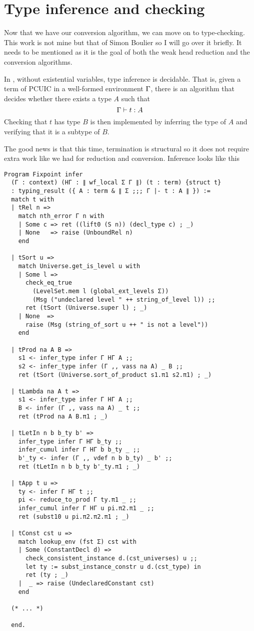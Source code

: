 \chapter{Type inference and checking}

Now that we have our conversion algorithm, we can move on to type-checking.
This work is not mine but that of Simon Boulier so I will go over it briefly.
It needs to be mentioned as it is the goal of both the weak head reduction
and the conversion algorithms.

In \Coq, without existential variables, type inference is decidable. That is,
given a term of \acrshort{PCUIC} in a well-formed environment \(\Gamma\), there is
an algorithm that decides whether there exists a type \(A\) such that
\[
  \Gamma \vdash t : A
\]
%
Checking that \(t\) has type \(B\) is then implemented by inferring the type of
\(A\) and verifying that it is a subtype of \(B\).

The good news is that this time, termination is structural so it does not require
extra work like we had for reduction and conversion.
Inference looks like this
\begin{verbatim}
Program Fixpoint infer
  (Γ : context) (HΓ : ∥ wf_local Σ Γ ∥) (t : term) {struct t}
  : typing_result ({ A : term & ∥ Σ ;;; Γ |- t : A ∥ }) :=
  match t with
  | tRel n =>
    match nth_error Γ n with
    | Some c => ret ((lift0 (S n)) (decl_type c) ; _)
    | None   => raise (UnboundRel n)
    end

  | tSort u =>
    match Universe.get_is_level u with
    | Some l =>
      check_eq_true
        (LevelSet.mem l (global_ext_levels Σ))
        (Msg ("undeclared level " ++ string_of_level l)) ;;
      ret (tSort (Universe.super l) ; _)
    | None  =>
      raise (Msg (string_of_sort u ++ " is not a level"))
    end

  | tProd na A B =>
    s1 <- infer_type infer Γ HΓ A ;;
    s2 <- infer_type infer (Γ ,, vass na A) _ B ;;
    ret (tSort (Universe.sort_of_product s1.π1 s2.π1) ; _)

  | tLambda na A t =>
    s1 <- infer_type infer Γ HΓ A ;;
    B <- infer (Γ ,, vass na A) _ t ;;
    ret (tProd na A B.π1 ; _)

  | tLetIn n b b_ty b' =>
    infer_type infer Γ HΓ b_ty ;;
    infer_cumul infer Γ HΓ b b_ty _ ;;
    b'_ty <- infer (Γ ,, vdef n b b_ty) _ b' ;;
    ret (tLetIn n b b_ty b'_ty.π1 ; _)

  | tApp t u =>
    ty <- infer Γ HΓ t ;;
    pi <- reduce_to_prod Γ ty.π1 _ ;;
    infer_cumul infer Γ HΓ u pi.π2.π1 _ ;;
    ret (subst10 u pi.π2.π2.π1 ; _)

  | tConst cst u =>
    match lookup_env (fst Σ) cst with
    | Some (ConstantDecl d) =>
      check_consistent_instance d.(cst_universes) u ;;
      let ty := subst_instance_constr u d.(cst_type) in
      ret (ty ; _)
    |  _ => raise (UndeclaredConstant cst)
    end

  (* ... *)

  end.
\end{verbatim}


